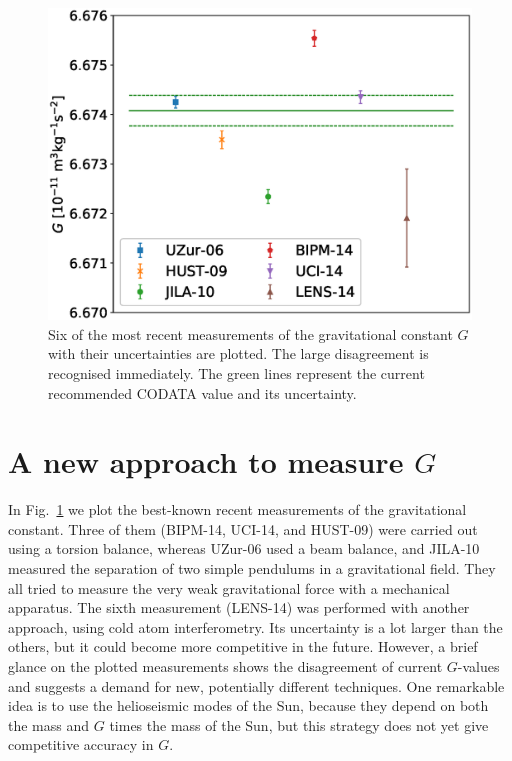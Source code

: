 \documentclass[prb,preprint]{revtex4-1}
\begin{document}
\begin{figure}
	\centering
	\includegraphics[width=\textwidth]{img/plotGmeas}
	\caption{Six of the most recent measurements of the gravitational constant $G$ with their uncertainties are plotted. The large disagreement is recognised immediately. The green lines represent the current recommended CODATA value and its uncertainty.\cite{CODATA16}}
	\label{fig:Gmeasurements}
\end{figure}

\section{A new approach to measure $G$}
In Fig.~\ref{fig:Gmeasurements} we plot the best-known recent
measurements of the gravitational constant. Three of them
(BIPM-14,\cite{Quinn14} UCI-14,\cite{Newman14} and
HUST-09\cite{Luo09}) were carried out using a torsion balance, whereas
UZur-06\cite{Schlamminger06} used a beam balance, and
JILA-10\cite{Parks10} measured the separation of two simple pendulums
in a gravitational field. They all tried to measure the very weak
gravitational force with a mechanical apparatus. The sixth measurement
(LENS-14\cite{Rosi14}) was performed with another approach, using cold
atom interferometry. Its uncertainty is a lot larger than the others,
but it could become more competitive in the future. However, a brief
glance on the plotted measurements shows the disagreement of current
$G$-values and suggests a demand for new, potentially different
techniques.  One remarkable idea is to use the helioseismic modes of
the Sun, because they depend on both the mass and $G$ times the mass
of the Sun,\cite{Ch-Dalsgaard05} but this strategy does not yet give
competitive accuracy in $G$.
\end{document}
